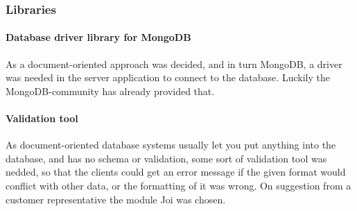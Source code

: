 \subsubsection{Libraries}
    \paragraph{Database driver library for MongoDB}
    As a document-oriented approach was decided, and in turn MongoDB, a driver was needed in the server application to connect to the database. Luckily the MongoDB-community has already provided that. \cite{node-mongodb-driver}

    \paragraph{Validation tool}
    As document-oriented database systems usually let you put anything into the database, and has no schema or validation, some sort of validation tool was nedded, so that the clients could get an error message if the given format would conflict with other data, or the formatting of it was wrong. On suggestion from a customer representative the module Joi was chosen. \cite{node-joi-module}


